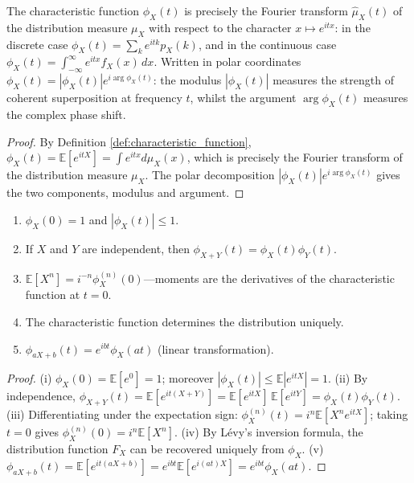 \begin{theorem}\label{thm:characteristic_fourier}
The characteristic function $\phi_X(t)$ is precisely the Fourier transform $\widehat{\mu}_X(t)$ of the distribution measure $\mu_X$ with respect to the character $x \mapsto e^{itx}$: in the discrete case $\phi_X(t) = \sum_k e^{itk} p_X(k)$, and in the continuous case $\phi_X(t) = \int_{-\infty}^{\infty} e^{itx} f_X(x)\,dx$. Written in polar coordinates $\phi_X(t) = |\phi_X(t)| e^{i\arg\phi_X(t)}$: the modulus $|\phi_X(t)|$ measures the strength of coherent superposition at frequency $t$, whilst the argument $\arg\phi_X(t)$ measures the complex phase shift.
\end{theorem}

\begin{proof}
By Definition \ref{def:characteristic_function}, $\phi_X(t) = \mathbb{E}[e^{itX}] = \int e^{itx} d\mu_X(x)$, which is precisely the Fourier transform of the distribution measure $\mu_X$. The polar decomposition $|\phi_X(t)| e^{i\arg\phi_X(t)}$ gives the two components, modulus and argument.
\end{proof}

\begin{proposition}\label{prop:characteristic_function_properties}
\begin{enumerate}[label=(\roman*)]
    \item $\phi_X(0) = 1$ and $|\phi_X(t)| \le 1$.
    \item If $X$ and $Y$ are independent, then $\phi_{X+Y}(t) = \phi_X(t) \phi_Y(t)$.
    \item $\mathbb{E}[X^n] = i^{-n} \phi_X^{(n)}(0)$---moments are the derivatives of the characteristic function at $t=0$.
    \item The characteristic function determines the distribution uniquely.
    \item $\phi_{aX+b}(t) = e^{ibt} \phi_X(at)$ (linear transformation).
\end{enumerate}
\end{proposition}

\begin{proof}
(i) $\phi_X(0) = \mathbb{E}[e^{0}] = 1$; moreover $|\phi_X(t)| \le \mathbb{E}|e^{itX}| = 1$.
(ii) By independence, $\phi_{X+Y}(t) = \mathbb{E}[e^{it(X+Y)}] = \mathbb{E}[e^{itX}]\,\mathbb{E}[e^{itY}] = \phi_X(t)\phi_Y(t)$.
(iii) Differentiating under the expectation sign: $\phi_X^{(n)}(t) = i^n \mathbb{E}[X^n e^{itX}]$; taking $t = 0$ gives $\phi_X^{(n)}(0) = i^n \mathbb{E}[X^n]$.
(iv) By Lévy's inversion formula, the distribution function $F_X$ can be recovered uniquely from $\phi_X$.
(v) $\phi_{aX+b}(t) = \mathbb{E}[e^{it(aX+b)}] = e^{ibt} \mathbb{E}[e^{i(at)X}] = e^{ibt} \phi_X(at)$.
\end{proof}

